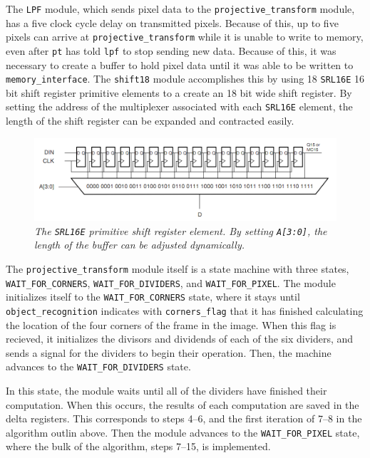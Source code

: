 \documentclass[10pt]{article}
\begin{document}
The {\tt LPF} module, which sends pixel data to the {\tt projective\_transform} module, has a five clock cycle delay on transmitted pixels. Because of this, up to five pixels can arrive at {\tt projective\_transform} while it is unable to write to memory, even after {\tt pt} has told {\tt lpf} to stop sending new data. Because of this, it was necessary to create a buffer to hold pixel data until it was able to be written to {\tt memory\_interface}. The {\tt shift18} module accomplishes this by using 18 {\tt SRL16E} 16 bit shift register primitive elements to a create an 18 bit wide shift register. By setting the address of the multiplexer associated with each {\tt SRL16E} element, the length of the shift register can be expanded and contracted easily.

\begin{figure}[h!]
\centering
\includegraphics[width=\textwidth]{images/srl16.png}
\caption{\emph{The {\tt SRL16E} primitive shift register element. By setting {\tt A[3:0]}, the length of the buffer can be adjusted dynamically.}}
\end{figure}

The {\tt projective\_transform} module itself is a state machine with three states, {\tt WAIT\_FOR\_CORNERS}, {\tt WAIT\_FOR\_DIVIDERS}, and {\tt WAIT\_FOR\_PIXEL}. The module initializes itself to the {\tt WAIT\_FOR\_CORNERS} state, where it stays until {\tt object\_recognition} indicates with {\tt corners\_flag} that it has finished calculating the location of the four corners of the frame in the image. When this flag is recieved, it initializes the divisors and dividends of each of the six dividers, and sends a signal for the dividers to begin their operation. Then, the machine advances to the {\tt WAIT\_FOR\_DIVIDERS} state.

In this state, the module waits until all of the dividers have finished their computation. When this occurs, the results of each computation are saved in the delta registers. This corresponds to steps 4--6, and the first iteration of 7--8 in the algorithm outlin above. Then the module advances to the {\tt WAIT\_FOR\_PIXEL} state, where the bulk of the algorithm, steps 7--15, is implemented.
\end{document}
